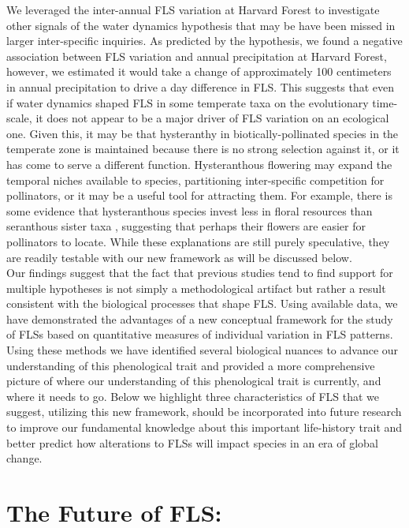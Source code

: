\documentclass{article}
\begin{document}
{\noindent We leveraged the inter-annual FLS variation at Harvard Forest to investigate other signals of the water dynamics hypothesis that may be have been missed in larger inter-specific inquiries. As predicted by the hypothesis, we found a negative association between FLS variation and annual precipitation at Harvard Forest, however, we estimated it would take a change of approximately 100 centimeters in annual precipitation to drive a day difference in FLS. This suggests that even if water dynamics shaped FLS in some temperate taxa on the evolutionary time-scale, it does not appear to be a major driver of FLS variation on an ecological one. Given this, it may be that hysteranthy in biotically-pollinated species in the temperate zone is maintained because there is no strong selection against it, or it has come to serve a different function. Hysteranthous flowering may expand the temporal niches available to species, partitioning inter-specific competition for pollinators, or it may be a useful tool for attracting them. For example, there is some evidence that hysteranthous species invest less in floral resources than seranthous sister taxa \citep{Gunatilleke1984}, suggesting that perhaps their flowers are easier for pollinators to locate. While these explanations are still purely speculative, they are readily testable with our new framework as will be discussed below.\\

\noindent Our findings suggest that the fact that previous studies tend to find support for multiple hypotheses is not simply a methodological artifact but rather a result consistent with the biological processes that shape FLS. Using available data, we have demonstrated the advantages of a new conceptual framework for the study of FLSs based on quantitative measures of individual variation in FLS patterns. Using these methods we have identified several biological nuances to advance our understanding of this phenological trait and provided a more comprehensive picture of where our understanding of this phenological trait is currently, and where it needs to go. Below we highlight three characteristics of FLS that we suggest, utilizing this new framework, should be incorporated into future research to improve our fundamental knowledge about this important life-history trait and better predict how alterations to FLSs will impact species in an era of global change.
\section*{The Future of FLS:}
}
\end{document}
